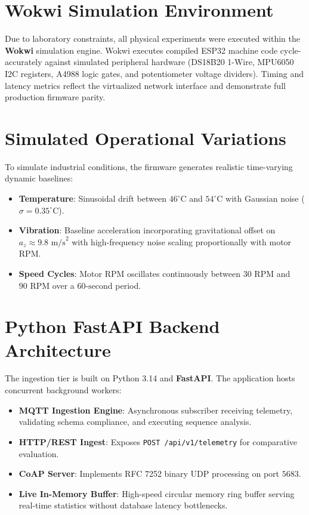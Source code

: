 \documentclass[12pt,a4paper]{report}
\begin{document}
\section{Wokwi Simulation Environment}
Due to laboratory constraints, all physical experiments were executed within the \textbf{Wokwi} simulation engine. Wokwi executes compiled ESP32 machine code cycle-accurately against simulated peripheral hardware (DS18B20 1-Wire, MPU6050 I2C registers, A4988 logic gates, and potentiometer voltage dividers). Timing and latency metrics reflect the virtualized network interface and demonstrate full production firmware parity.

\section{Simulated Operational Variations}
To simulate industrial conditions, the firmware generates realistic time-varying dynamic baselines:
\begin{itemize}
    \item \textbf{Temperature}: Sinusoidal drift between $46^{\circ}\text{C}$ and $54^{\circ}\text{C}$ with Gaussian noise ($\sigma = 0.35^{\circ}\text{C}$).
    \item \textbf{Vibration}: Baseline acceleration incorporating gravitational offset on $a_z \approx 9.8\text{ m/s}^2$ with high-frequency noise scaling proportionally with motor RPM.
    \item \textbf{Speed Cycles}: Motor RPM oscillates continuously between $30\text{ RPM}$ and $90\text{ RPM}$ over a $60\text{-second}$ period.
\end{itemize}

\section{Python FastAPI Backend Architecture}
The ingestion tier is built on Python 3.14 and \textbf{FastAPI}. The application hosts concurrent background workers:
\begin{itemize}
    \item \textbf{MQTT Ingestion Engine}: Asynchronous subscriber receiving telemetry, validating schema compliance, and executing sequence analysis.
    \item \textbf{HTTP/REST Ingest}: Exposes \texttt{POST /api/v1/telemetry} for comparative evaluation.
    \item \textbf{CoAP Server}: Implements RFC 7252 binary UDP processing on port $5683$.
    \item \textbf{Live In-Memory Buffer}: High-speed circular memory ring buffer serving real-time statistics without database latency bottlenecks.
\end{itemize}
\end{document}
